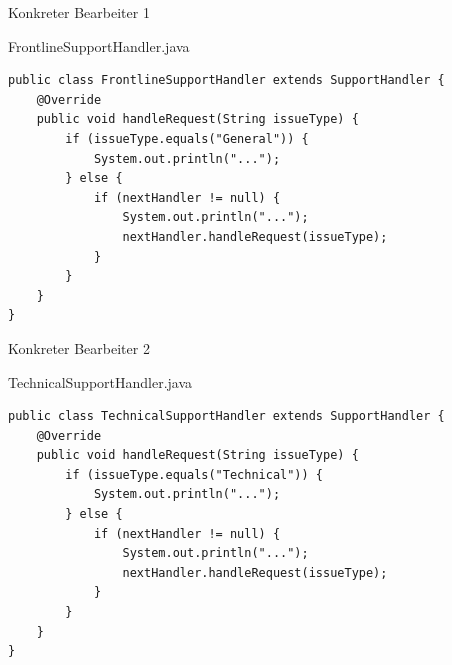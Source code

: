 \begin{frame}[fragile]{Konkreter Bearbeiter 1}
	\begin{exampleblock}{FrontlineSupportHandler.java}
 		\begin{lstlisting}
public class FrontlineSupportHandler extends SupportHandler {
    @Override
    public void handleRequest(String issueType) {
        if (issueType.equals("General")) {
            System.out.println("...");
        } else {
            if (nextHandler != null) {
                System.out.println("...");
                nextHandler.handleRequest(issueType);
            }
        }
    }
}    
 		\end{lstlisting}
 	\end{exampleblock}
\end{frame}

\begin{frame}[fragile]{Konkreter Bearbeiter 2}
	\begin{exampleblock}{TechnicalSupportHandler.java}
 		\begin{lstlisting}
public class TechnicalSupportHandler extends SupportHandler {
    @Override
    public void handleRequest(String issueType) {
        if (issueType.equals("Technical")) {
            System.out.println("...");
        } else {
            if (nextHandler != null) {
                System.out.println("...");
                nextHandler.handleRequest(issueType);
            }
        }
    }
}
        \end{lstlisting}
 	\end{exampleblock}
\end{frame}


